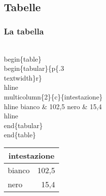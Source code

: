 \subsection{Tabelle}
\begin{frame}
  \frametitle{La tabella}
	\begin{LaTeXcode}
		\alert{\\begin\{table\}}\n
		\\begin\{tabular\}\{p\{.3\\textwidth\}r\}\
		\\hline \n
		\\multicolumn\{2\}\{c\}\{intestazione\}\bs\bs \
		\\hline \n
		\hspace*{5ex}bianco \& 102,5 \bs\bs\n
		\hspace*{5ex}nero   \& 15,4 \bs\bs\
		\\hline\n
		\\end\{tabular\}\n
		\alert{\\end\{table\}}
	\end{LaTeXcode}
	\begin{LaTeXoutput}\centering
		\begin{tabular}{p{}r}\hline
		\multicolumn{2}{c}{intestazione}\\\hline
		bianco & 102,5 \\
		nero   & 15,4 \\\hline
		\end{tabular}
	\end{LaTeXoutput}
\end{frame}
